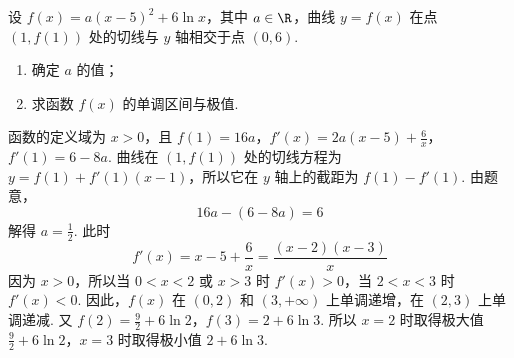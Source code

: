 \begin{problem}
设 \( f(x) = a(x - 5)^2 + 6\ln x \)，其中 \( a \in \R \)，曲线 \( y = f(x) \) 在点 \((1, f(1))\) 处的切线与 \( y \) 轴相交于点 \((0, 6)\).
\begin{enumerate}
\item 确定 \(a\) 的值；
\item 求函数 \( f(x) \) 的单调区间与极值.
\end{enumerate}

\begin{solution}
函数的定义域为 \(x>0\)，且
\(f(1)=16a\)，\(f'(x)=2a(x-5)+\frac{6}{x}\)，\(f'(1)=6-8a\).
曲线在 \((1,f(1))\) 处的切线方程为 \(y=f(1)+f'(1)(x-1)\)，所以它在 \(y\) 轴上的截距为 \(f(1)-f'(1)\). 由题意，
\[
16a-(6-8a)=6
\]
解得 \(a=\frac{1}{2}\). 此时
\[
f'(x)=x-5+\frac{6}{x}=\frac{(x-2)(x-3)}{x}
\]
因为 \(x>0\)，所以当 \(0<x<2\) 或 \(x>3\) 时 \(f'(x)>0\)，当 \(2<x<3\) 时 \(f'(x)<0\). 因此，\(f(x)\) 在 \((0,2)\) 和 \((3,+\infty)\) 上单调递增，在 \((2,3)\) 上单调递减.
又
\(f(2)=\frac{9}{2}+6\ln 2\)，\(f(3)=2+6\ln 3\).
所以 \(x=2\) 时取得极大值 \(\frac{9}{2}+6\ln 2\)，\(x=3\) 时取得极小值 \(2+6\ln 3\).
\end{solution}

\end{problem}

